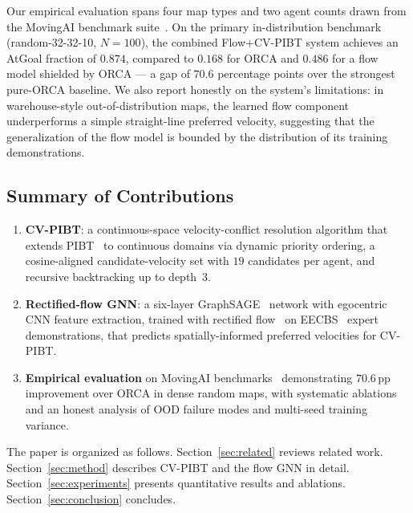 Our empirical evaluation spans four map types and two agent counts drawn from the MovingAI benchmark suite~\cite{sturtevant2012movingai}. On the primary in-distribution benchmark (random-32-32-10, $N=100$), the combined \mbox{Flow+CV-PIBT} system achieves an AtGoal fraction of $0.874$, compared to $0.168$ for ORCA and $0.486$ for a flow model shielded by ORCA --- a gap of $70.6$ percentage points over the strongest pure-ORCA baseline. We also report honestly on the system's limitations: in warehouse-style out-of-distribution maps, the learned flow component underperforms a simple straight-line preferred velocity, suggesting that the generalization of the flow model is bounded by the distribution of its training demonstrations.

\subsection*{Summary of Contributions}

\begin{enumerate}
  \item \textbf{CV-PIBT}: a continuous-space velocity-conflict resolution algorithm that extends PIBT~\cite{okumura2022pibt} to continuous domains via dynamic priority ordering, a cosine-aligned candidate-velocity set with $19$ candidates per agent, and recursive backtracking up to depth~3.

  \item \textbf{Rectified-flow GNN}: a six-layer GraphSAGE~\cite{hamilton2017graphsage} network with egocentric CNN feature extraction, trained with rectified flow~\cite{liu2023rectifiedflow} on EECBS~\cite{li2021eecbs} expert demonstrations, that predicts spatially-informed preferred velocities for CV-PIBT.

  \item \textbf{Empirical evaluation} on MovingAI benchmarks~\cite{sturtevant2012movingai} demonstrating $70.6$\,pp improvement over ORCA in dense random maps, with systematic ablations and an honest analysis of OOD failure modes and multi-seed training variance.
\end{enumerate}

The paper is organized as follows. Section~\ref{sec:related} reviews related work. Section~\ref{sec:method} describes CV-PIBT and the flow GNN in detail. Section~\ref{sec:experiments} presents quantitative results and ablations. Section~\ref{sec:conclusion} concludes.
